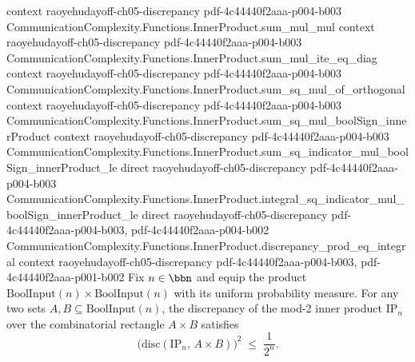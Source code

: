\begin{lemma}
  {context}
  {raoyehudayoff-ch05-discrepancy}
  {pdf-4c44440f2aaa-p004-b003}
\proofstep
  {CommunicationComplexity.Functions.InnerProduct.sum_mul_mul}
  {context}
  {raoyehudayoff-ch05-discrepancy}
  {pdf-4c44440f2aaa-p004-b003}
\proofstep
  {CommunicationComplexity.Functions.InnerProduct.sum_mul_ite_eq_diag}
  {context}
  {raoyehudayoff-ch05-discrepancy}
  {pdf-4c44440f2aaa-p004-b003}
\proofstep
  {CommunicationComplexity.Functions.InnerProduct.sum_sq_mul_of_orthogonal}
  {context}
  {raoyehudayoff-ch05-discrepancy}
  {pdf-4c44440f2aaa-p004-b003}
\proofstep
  {CommunicationComplexity.Functions.InnerProduct.sum_sq_mul_boolSign_innerProduct}
  {context}
  {raoyehudayoff-ch05-discrepancy}
  {pdf-4c44440f2aaa-p004-b003}
\proofstep
  {CommunicationComplexity.Functions.InnerProduct.sum_sq_indicator_mul_boolSign_innerProduct_le}
  {direct}
  {raoyehudayoff-ch05-discrepancy}
  {pdf-4c44440f2aaa-p004-b003}
\proofstep
  {CommunicationComplexity.Functions.InnerProduct.integral_sq_indicator_mul_boolSign_innerProduct_le}
  {direct}
  {raoyehudayoff-ch05-discrepancy}
  {pdf-4c44440f2aaa-p004-b003,
    pdf-4c44440f2aaa-p004-b002}
\proofstep
  {CommunicationComplexity.Functions.InnerProduct.discrepancy_prod_eq_integral}
  {context}
  {raoyehudayoff-ch05-discrepancy}
  {pdf-4c44440f2aaa-p004-b003,
    pdf-4c44440f2aaa-p001-b002}
Fix $n \in \bbn$ and equip the product $\mathrm{BoolInput}(n) \times
\mathrm{BoolInput}(n)$ with its uniform probability measure. For any two sets $A, B
\subseteq \mathrm{BoolInput}(n)$, the discrepancy of the mod-2 inner product
$\mathrm{IP}_n$ over the combinatorial rectangle $A \times B$ satisfies
\[
  \bigl(\mathrm{disc}(\mathrm{IP}_n,\, A \times B)\bigr)^2 \;\le\; \frac{1}{2^n}.
\]
\end{lemma}

